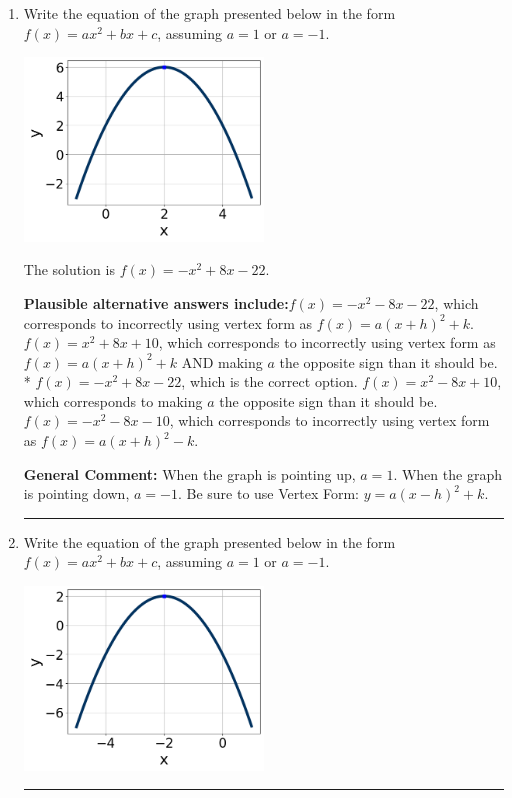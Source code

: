 \documentclass{extbook}[14pt]
\newcommand{\litem}[1]{\item #1

\rule{\textwidth}{0.4pt}}
\begin{document}
\begin{enumerate}\litem{
Write the equation of the graph presented below in the form $f(x)=ax^2+bx+c$, assuming  $a=1$ or $a=-1$.

\begin{center}
    \includegraphics[width=0.5\textwidth]{../Figures/quadraticGraphToEquationCopyB.png}
\end{center}


The solution is \( f(x) = -x^{2} +8 x -22 \).\begin{enumerate}[label=\Alph*.]
\textbf{Plausible alternative answers include:}$f(x)=-x^{2} -8 x -22$, which corresponds to incorrectly using vertex form as $f(x) = a(x+h)^2+k$.
$f(x)=x^{2} +8 x + 10$, which corresponds to incorrectly using vertex form as $f(x) = a(x+h)^2+k$ AND making $a$ the opposite sign than it should be.
* $f(x)=-x^{2} +8 x -22$, which is the correct option.
$f(x)=x^{2} -8 x + 10$, which corresponds to making $a$ the opposite sign than it should be.
$f(x)=-x^{2} -8 x -10$, which corresponds to incorrectly using vertex form as $f(x) = a(x+h)^2 - k$.
\end{enumerate}

\textbf{General Comment:} When the graph is pointing up, $a=1$. When the graph is pointing down, $a=-1$. Be sure to use Vertex Form: $y = a(x-h)^2+k$.
}
\litem{
Write the equation of the graph presented below in the form $f(x)=ax^2+bx+c$, assuming  $a=1$ or $a=-1$.

\begin{center}
    \includegraphics[width=0.5\textwidth]{../Figures/quadraticGraphToEquationB.png}
\end{center}


}
\end{enumerate}
\end{document}
